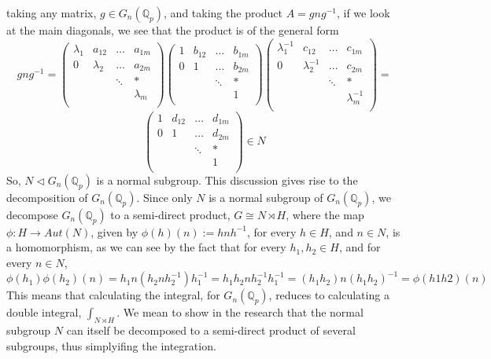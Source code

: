 \documentclass[12pt]{article}
\begin{document}
taking any matrix, $g\in G_n(\mathbb{Q}_p)$, and taking the product $A=gng^{-1}$, if we look at the main diagonals, we see that the product is of the general form $$
gng^{-1}=\begin{pmatrix}
\lambda_1 & a_{12} & \dots & a_{1m}\\
0 & \lambda_2 & \dots & a_{2m}\\
& & \ddots &*\\
& & & \lambda_m\\
\end{pmatrix}\begin{pmatrix}
1 & b_{12} & \dots & b_{1m}\\
0 & 1 & \dots & b_{2m}\\
& & \ddots &*\\
& & & 1\\
\end{pmatrix}\begin{pmatrix}
\lambda_1^{-1} & c_{12} & \dots & c_{1m}\\
0 & \lambda_2^{-1} & \dots & c_{2m}\\
& & \ddots &*\\
& & & \lambda_m^{-1}\\
\end{pmatrix}=$$
$$
\begin{pmatrix}
1 & d_{12} & \dots & d_{1m}\\
0 & 1 & \dots & d_{2m}\\
& & \ddots &*\\
& & & 1\\
\end{pmatrix}\in N
$$
So, $N\lhd G_n(\mathbb{Q}_p)$ is a normal subgroup.
This discussion gives rise to the decomposition of $G_n(\mathbb{Q}_p)$. 
Since only $N$ is a normal subgroup of $G_n(\mathbb{Q}_p)$, we decompose $G_n(\mathbb{Q}_p)$ to a semi-direct product, $G\cong N\rtimes H$, where the map $\phi:H\rightarrow Aut(N)$, given by $\phi(h)(n):=hnh^{-1}$, for every $h\in H$, and $n\in N$, is a homomorphism, as we can see by the fact that for every $h_1,h_2\in H$, and for every $n\in N$, $\phi(h_1)\phi(h_2)(n)=h_1n(h_2nh_2^{-1})h_1^{-1}=h_1h_2nh_2^{-1}h_1^{-1}=(h_1h_2)n(h_1h_2)^{-1}=\phi(h1h2)
(n)$
This means that calculating the integral, for $G_n(\mathbb{Q}_p)$, reduces to calculating a double integral, $\displaystyle\int_{N\rtimes H}$. We mean to show in the research that the normal subgroup $N$ can itself be decomposed to a semi-direct product of several subgroups, thus simplyifing the integration.
\end{document}
